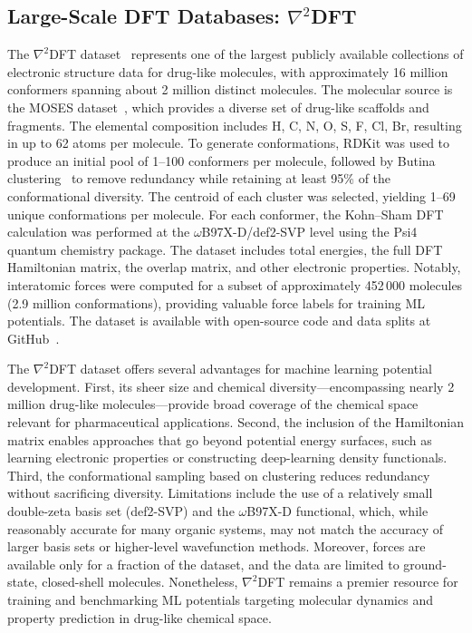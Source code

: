 \documentclass[12pt]{article}
\begin{document}
\subsection{Large-Scale DFT Databases: \(\nabla^2\)DFT}\label{sec:nabla2dft}

The \(\nabla^2\)DFT dataset~\cite{ds31-23} represents one of the largest publicly available collections of electronic structure data for drug-like molecules, with approximately 16 million conformers spanning about 2 million distinct molecules. The molecular source is the MOSES dataset~\cite{ds31-156}, which provides a diverse set of drug-like scaffolds and fragments. The elemental composition includes H, C, N, O, S, F, Cl, Br, resulting in up to 62 atoms per molecule. To generate conformations, RDKit was used to produce an initial pool of 1–100 conformers per molecule, followed by Butina clustering~\cite{ds31-159} to remove redundancy while retaining at least 95\% of the conformational diversity. The centroid of each cluster was selected, yielding 1–69 unique conformations per molecule. For each conformer, the Kohn–Sham DFT calculation was performed at the \(\omega\)B97X-D/def2-SVP level using the Psi4 quantum chemistry package. The dataset includes total energies, the full DFT Hamiltonian matrix, the overlap matrix, and other electronic properties. Notably, interatomic forces were computed for a subset of approximately 452\,000 molecules (2.9 million conformations), providing valuable force labels for training ML potentials. The dataset is available with open-source code and data splits at GitHub~\cite{ds31-23}.

The \(\nabla^2\)DFT dataset offers several advantages for machine learning potential development. First, its sheer size and chemical diversity—encompassing nearly 2 million drug-like molecules—provide broad coverage of the chemical space relevant for pharmaceutical applications. Second, the inclusion of the Hamiltonian matrix enables approaches that go beyond potential energy surfaces, such as learning electronic properties or constructing deep-learning density functionals. Third, the conformational sampling based on clustering reduces redundancy without sacrificing diversity. Limitations include the use of a relatively small double-zeta basis set (def2-SVP) and the \(\omega\)B97X-D functional, which, while reasonably accurate for many organic systems, may not match the accuracy of larger basis sets or higher-level wavefunction methods. Moreover, forces are available only for a fraction of the dataset, and the data are limited to ground-state, closed-shell molecules. Nonetheless, \(\nabla^2\)DFT remains a premier resource for training and benchmarking ML potentials targeting molecular dynamics and property prediction in drug-like chemical space.
\end{document}
